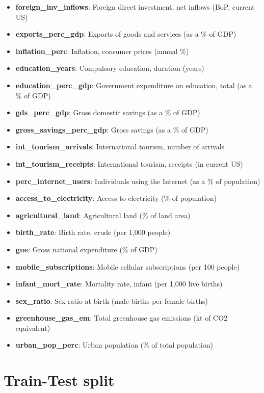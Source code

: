 \documentclass[]{article}
\providecommand{\tightlist}{%
  \setlength{\itemsep}{0pt}\setlength{\parskip}{0pt}}
\begin{document}
\begin{itemize}
\tightlist
\item
  \textbf{foreign\_inv\_inflows}: Foreign direct investment, net inflows
  (BoP, current US)
\item
  \textbf{exports\_perc\_gdp}: Exports of goods and services (as a \% of
  GDP)
\item
  \textbf{inflation\_perc}: Inflation, consumer prices (annual \%)
\item
  \textbf{education\_years}: Compulsory education, duration (years)
\item
  \textbf{education\_perc\_gdp}: Government expenditure on education,
  total (as a \% of GDP)
\item
  \textbf{gds\_perc\_gdp}: Gross domestic savings (as a \% of GDP)
\item
  \textbf{gross\_savings\_perc\_gdp}: Gross savings (as a \% of GDP)
\item
  \textbf{int\_tourism\_arrivals}: International tourism, number of
  arrivals
\item
  \textbf{int\_tourism\_receipts}: International tourism, receipts (in
  current US)
\item
  \textbf{perc\_internet\_users}: Individuals using the Internet (as a
  \% of population)
\item
  \textbf{access\_to\_electricity}: Access to electricity (\% of
  population)
\item
  \textbf{agricultural\_land}: Agricultural land (\% of land area)
\item
  \textbf{birth\_rate}: Birth rate, crude (per 1,000 people)
\item
  \textbf{gne}: Gross national expenditure (\% of GDP)
\item
  \textbf{mobile\_subscriptions}: Mobile cellular subscriptions (per 100
  people)
\item
  \textbf{infant\_mort\_rate}: Mortality rate, infant (per 1,000 live
  births)
\item
  \textbf{sex\_ratio}: Sex ratio at birth (male births per female
  births)
\item
  \textbf{greenhouse\_gas\_em}: Total greenhouse gas emissions (kt of
  CO2 equivalent)
\item
  \textbf{urban\_pop\_perc}: Urban population (\% of total population)
\end{itemize}

\hypertarget{train-test-split}{%
\section{Train-Test split}\label{train-test-split}}
\end{document}
